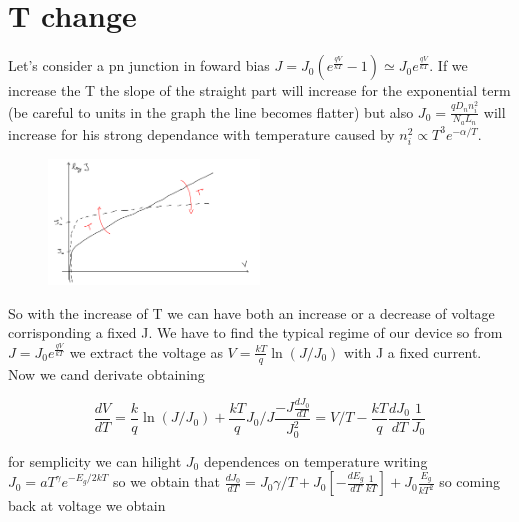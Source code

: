 \centering
{}
\raggedright

\section{T change}
Let's consider a pn junction in foward bias $J=J_0(e^{\frac{qV}{kT}}-1)\simeq J_0e^{\frac{qV}{kT}}$. If we increase the T the slope of the straight part will increase for the exponential term (be careful to units in the graph the line becomes flatter) but also $J_0=\frac{qD_nn_i^2}{N_aL_n}$ will increase for his strong dependance with temperature caused by $n_i^2\propto T^3e^{-\alpha/T}$.

\begin{figure}
\includegraphics[width=0.5\textwidth]{JwithT.png}
\end{figure}

So with the increase of T we can have both an increase or a decrease of voltage corrisponding a fixed J. We have to find the typical regime of our device so from $J=J_0e^{\frac{qV}{kT}}$ we extract the voltage as $V=\frac{kT}{q}\ln(J/J_0)$ with J a fixed current. Now we cand derivate obtaining

\begin{equation}
\frac{dV}{dT}= \frac{k}{q}\ln(J/J_0)+\frac{kT}{q}J_0/J \frac{-J \frac{dJ_0}{dT}}{J_0^2}=V/T-\frac{kT}{q}\frac{dJ_0}{dT}\frac{1}{J_0}
\end{equation}

for semplicity we can hilight $J_0$ dependences on temperature writing $J_0=aT^\gamma e^{-E_g/2kT}$ so we obtain that $\frac{dJ_0}{dT}=J_0\gamma/T+J_0[-\frac{dE_g}{dT}\frac{1}{kT}] + J_0 \frac{E_g}{kT^2}$ so coming back at voltage we obtain

